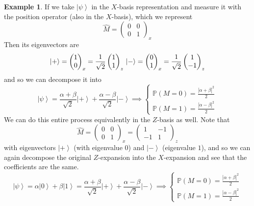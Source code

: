 \documentclass{article}
\newcommand{\ket}[1]{\ensuremath{\left|#1\right\rangle}}
\theoremstyle{definition}
\newtheorem{example}{Example}[section]
\begin{document}
    \begin{example} 
      If we take $\ket{\psi}$ in the $X$-basis representation and measure it with the position operator (also in the $X$-basis), which we represent 
      \begin{equation} 
        \hat{M} = \begin{pmatrix} 0 & 0 \\ 0 & 1 \end{pmatrix}_x
      \end{equation} 
      Then its eigenvectors are 
      \begin{equation} 
        \ket{+} = \begin{pmatrix} 1 \\ 0 \end{pmatrix}_x = \frac{1}{\sqrt{2}} \begin{pmatrix} 1 \\ 1 \end{pmatrix}_z \\ 
        \ket{-} = \begin{pmatrix} 0 \\ 1 \end{pmatrix}_x = \frac{1}{\sqrt{2}} \begin{pmatrix} 1 \\ -1 \end{pmatrix}_z 
      \end{equation}
      and so we can decompose it into 
      \begin{equation} 
        \ket{\psi} = \frac{\alpha + \beta}{\sqrt{2}} \ket{+} + \frac{\alpha - \beta}{\sqrt{2}} \ket{-} \implies \begin{cases} \mathbb{P}(M = 0) = \frac{|\alpha + \beta|^2}{2} \\ \mathbb{P}(M = 1) = \frac{|\alpha - \beta|^2}{2} \end{cases}
      \end{equation}
      We can do this entire process equivalently in the $Z$-basis as well. Note that 
      \begin{equation} 
        \hat{M} = \begin{pmatrix} 0 & 0 \\ 0 & 1 \end{pmatrix}_x = \begin{pmatrix} 1 & -1 \\ -1 & 1 \end{pmatrix}_z
      \end{equation}
      with eigenvectors $\ket{+}$ (with eigenvalue $0$) and $\ket{-}$ (eigenvalue $1$), and so we can again decompose the original $Z$-expansion into the $X$-expansion and see that the coefficients are the same. 
      \begin{equation} 
        \ket{\psi} = \alpha \ket{0} + \beta \ket{1} = \frac{\alpha + \beta}{\sqrt{2}} \ket{+} + \frac{\alpha - \beta}{\sqrt{2}} \ket{-} \implies \begin{cases} \mathbb{P}(M = 0) = \frac{|\alpha + \beta|^2}{2} \\ \mathbb{P}(M = 1) = \frac{|\alpha - \beta|^2}{2} \end{cases}
      \end{equation} 
    \end{example}
\end{document}
